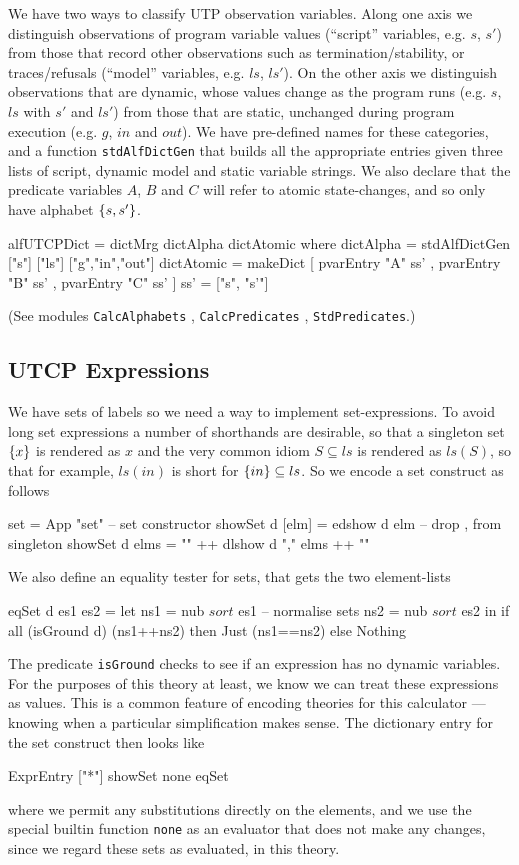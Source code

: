 We have two ways to classify UTP observation variables.
Along one axis we distinguish observations of program variable
values (``script'' variables, e.g. $s$, $s'$) from those that record other
observations such as termination/stability,
or traces/refusals (``model'' variables, e.g. $ls$, $ls'$).
On the other axis we distinguish observations
that are dynamic, whose values change as the program runs
(e.g. $s$, $ls$ with $s'$ and $ls'$)
from those that are static,
unchanged during program execution (e.g. $g$, $in$ and $out$).
We have pre-defined names for these categories,
and a function \texttt{stdAlfDictGen} that
builds all the appropriate entries
given three lists of script, dynamic model and static variable strings.
We also declare that the predicate variables $A$, $B$ and $C$
will refer to atomic state-changes,
and so only have alphabet $\{{s,s'}\}$.
\begin{code}
alfUTCPDict
 = dictMrg dictAlpha dictAtomic
 where
   dictAlpha = stdAlfDictGen ["s"] ["ls"] ["g","in","out"]
   dictAtomic = makeDict [ pvarEntry "A" ss'
                         , pvarEntry "B" ss'
                         , pvarEntry "C" ss' ]
   ss' = ["s", "s'"]
\end{code}
(See modules
\texttt{CalcAlphabets}
, \texttt{CalcPredicates}
, \texttt{StdPredicates}.)

\subsection{UTCP Expressions}

We have sets of labels
so we need a way to implement set-expressions.
To avoid long set expressions a number of shorthands are desirable,
so that a singleton set $\{{x}\}$ is rendered as $x$
and the very common idiom $S \subseteq ls$
is rendered as $ls(S)$,
so that for example, $ls(in)$ is short for $\{{in}\} \subseteq ls$.
So we encode a set construct as follows
\begin{code}
set = App "set"                             -- set constructor
showSet d [elm] = edshow d elm      -- drop {,} from singleton
showSet d elms = "{" ++ dlshow d "," elms ++ "}"
\end{code}
We also define an equality tester for sets,
that gets the two element-lists
\begin{code}
eqSet d es1 es2
 = let ns1 = nub $ sort $ es1                -- normalise sets
       ns2 = nub $ sort $ es2
   in if all (isGround d) (ns1++ns2)
      then Just (ns1==ns2)
      else Nothing
\end{code}
The predicate \texttt{isGround} checks to see if an expression has no
dynamic variables.
For the purposes of this theory at least,
we know we can treat these expressions as values.
This is a common feature of encoding theories for this calculator%
---%
knowing when a particular simplification makes sense.
The dictionary entry for the set construct then looks like
\begin{code}
ExprEntry ["*"] showSet none eqSet
\end{code}
where we permit any substitutions directly on the elements,
and we use the special builtin function \texttt{none}
as an evaluator that does not make any changes,
since we regard these sets as evaluated, in this theory.

